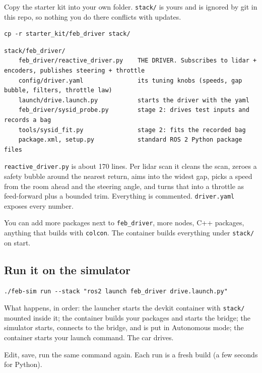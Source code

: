 \documentclass[11pt,a4paper]{article}
\newcommand{\file}[1]{\texttt{#1}}
\newcommand{\cmd}[1]{\texttt{#1}}
\begin{document}
Copy the starter kit into your own folder. \file{stack/} is yours and is ignored by git in
this repo, so nothing you do there conflicts with updates.

\begin{lstlisting}
cp -r starter_kit/feb_driver stack/
\end{lstlisting}

\begin{lstlisting}
stack/feb_driver/
    feb_driver/reactive_driver.py    THE DRIVER. Subscribes to lidar + encoders, publishes steering + throttle
    config/driver.yaml               its tuning knobs (speeds, gap bubble, filters, throttle law)
    launch/drive.launch.py           starts the driver with the yaml
    feb_driver/sysid_probe.py        stage 2: drives test inputs and records a bag
    tools/sysid_fit.py               stage 2: fits the recorded bag
    package.xml, setup.py            standard ROS 2 Python package files
\end{lstlisting}

\file{reactive\_driver.py} is about 170 lines. Per lidar scan it cleans the scan, zeroes a safety
bubble around the nearest return, aims into the widest gap, picks a speed from the room ahead
and the steering angle, and turns that into a throttle as feed-forward plus a bounded trim.
Everything is commented. \file{driver.yaml} exposes every number.

You can add more packages next to \file{feb\_driver}, more nodes, C++ packages, anything
that builds with \cmd{colcon}. The container builds everything under \file{stack/} on start.

\subsection{Run it on the simulator}

\begin{lstlisting}
./feb-sim run --stack "ros2 launch feb_driver drive.launch.py"
\end{lstlisting}

What happens, in order: the launcher starts the devkit container with \file{stack/} mounted
inside it; the container builds your packages and starts the bridge; the simulator starts,
connects to the bridge, and is put in Autonomous mode; the container starts your launch
command. The car drives.

Edit, save, run the same command again. Each run is a fresh build (a few seconds for Python).
\end{document}
